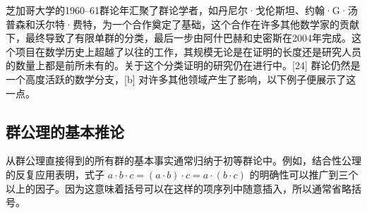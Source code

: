 芝加哥大学的1960–61群论年汇聚了群论学者，如丹尼尔·戈伦斯坦、约翰·G·汤普森和沃尔特·费特，为一个合作奠定了基础，这个合作在许多其他数学家的贡献下，最终导致了有限单群的分类，最后一步由阿什巴赫和史密斯在2004年完成。这个项目在数学历史上超越了以往的工作，其规模无论是在证明的长度还是研究人员的数量上都是前所未有的。关于这个分类证明的研究仍在进行中。[24] 群论仍然是一个高度活跃的数学分支，[b] 对许多其他领域产生了影响，以下例子便展示了这一点。
\subsection{群公理的基本推论}  
从群公理直接得到的所有群的基本事实通常归纳于初等群论中。例如，结合性公理的反复应用表明，式子 \( a \cdot b \cdot c = (a \cdot b) \cdot c = a \cdot (b \cdot c) \) 的明确性可以推广到三个以上的因子。因为这意味着括号可以在这样的项序列中随意插入，所以通常省略括号。
